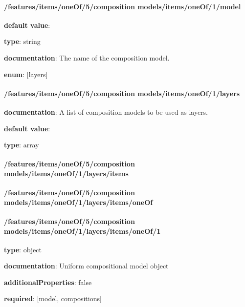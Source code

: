 \paragraph{/features/items/oneOf/5/composition models/items/oneOf/1/model} \begin{itemized}
\item {\bf default value}: 
\item {\bf type}: string
\item {\bf documentation}: The name of the composition model.
\item {\bf enum}: [layers]\end{itemized}\paragraph{/features/items/oneOf/5/composition models/items/oneOf/1/layers} \begin{itemized}
\item {\bf documentation}: A list of composition models to be used as layers.
\item {\bf default value}: 
\item {\bf type}: array
\paragraph{/features/items/oneOf/5/composition models/items/oneOf/1/layers/items} \begin{itemized}
\end{itemized}\end{itemized}\paragraph{/features/items/oneOf/5/composition models/items/oneOf/1/layers/items/oneOf} \begin{itemized}
\end{itemized}\paragraph{/features/items/oneOf/5/composition models/items/oneOf/1/layers/items/oneOf/1} \begin{itemized}
\item {\bf type}: object
\item {\bf documentation}: Uniform compositional model object
\item {\bf additionalProperties}: false
\item {\bf required}: [model, compositions]\end{itemized}

